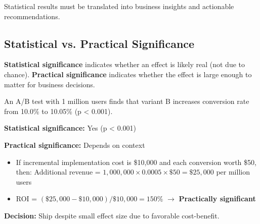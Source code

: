 Statistical results must be translated into business insights and actionable recommendations.

\subsection{Statistical vs. Practical Significance}

\textbf{Statistical significance} indicates whether an effect is likely real (not due to chance). \textbf{Practical significance} indicates whether the effect is large enough to matter for business decisions.

\begin{example}
An A/B test with 1 million users finds that variant B increases conversion rate from 10.0\% to 10.05\% (p < 0.001).

\textbf{Statistical significance:} Yes (p < 0.001)

\textbf{Practical significance:} Depends on context
\begin{itemize}
    \item If incremental implementation cost is \$10,000 and each conversion worth \$50, then: Additional revenue = $1,000,000 \times 0.0005 \times \$50 = \$25,000$ per million users
    \item ROI = $(\$25,000 - \$10,000) / \$10,000 = 150\%$ $\rightarrow$ \textbf{Practically significant}
\end{itemize}

\textbf{Decision:} Ship despite small effect size due to favorable cost-benefit.
\end{example}

